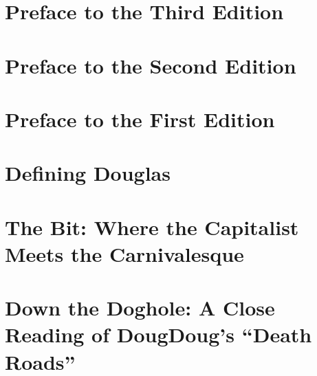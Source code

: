\documentclass[12pt]{book}
\begin{document}
\frontmatter







\tableofcontents

\chapter*{Preface to the Third Edition}


\chapter*{Preface to the Second Edition}


\chapter*{Preface to the First Edition}

\chapter*{Defining Douglas}


\mainmatter

\chapter{The Bit: Where the Capitalist Meets the Carnivalesque}


\chapter{Down the Doghole: A Close Reading of DougDoug's ``Death Roads''}

\end{document}
